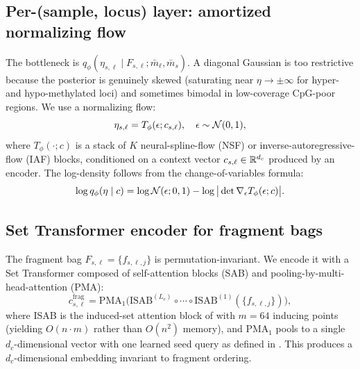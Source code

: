 \subsection{Per-(sample, locus) layer: amortized normalizing flow}
The bottleneck is $q_\phi(\eta_{s,\ell}\mid F_{s,\ell};\bar m_\ell,\bar m_s)$. A diagonal Gaussian is too restrictive because the posterior is genuinely skewed (saturating near $\eta\to\pm\infty$ for hyper- and hypo-methylated loci) and sometimes bimodal in low-coverage CpG-poor regions. We use a normalizing flow:
\begin{equation}
\eta_{s,\ell} = T_\phi(\epsilon; c_{s,\ell}),\quad \epsilon\sim\mathcal{N}(0,1),
\end{equation}
where $T_\phi(\cdot; c)$ is a stack of $K$ neural-spline-flow (NSF) \citep{durkan2019nsf} or inverse-autoregressive-flow (IAF) \citep{kingma2016iaf} blocks, conditioned on a context vector $c_{s,\ell}\in\mathbb{R}^{d_c}$ produced by an encoder. The log-density follows from the change-of-variables formula:
\begin{equation}
\log q_\phi(\eta\mid c) = \log\mathcal{N}(\epsilon;0,1) - \log\big|\det\nabla_\epsilon T_\phi(\epsilon; c)\big|.
\label{eq:flow-density}
\end{equation}

\subsection{Set Transformer encoder for fragment bags}
The fragment bag $F_{s,\ell}=\{f_{s,\ell,j}\}$ is permutation-invariant. We encode it with a Set Transformer \citep{lee2019settransformer} composed of self-attention blocks (SAB) and pooling-by-multi-head-attention (PMA):
\begin{equation}
c^{\mathrm{frag}}_{s,\ell}=\mathrm{PMA}_1\big(\mathrm{ISAB}^{(L_e)}\circ\cdots\circ \mathrm{ISAB}^{(1)}(\{f_{s,\ell,j}\})\big),
\end{equation}
where ISAB is the induced-set attention block of \citet{lee2019settransformer} with $m=64$ inducing points (yielding $O(n\cdot m)$ rather than $O(n^2)$ memory), and $\mathrm{PMA}_1$ pools to a single $d_c$-dimensional vector with one learned seed query as defined in \citet[\S 3.2]{lee2019settransformer}. This produces a $d_c$-dimensional embedding invariant to fragment ordering.


